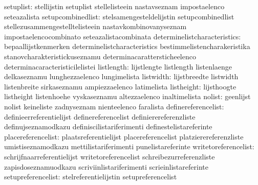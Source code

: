                        setuplist: stellijstin                      setuplist
                                  stellelisteein                   nastavseznam
                                  impostaelenco                    seteazalista
               setupcombinedlist: stelsamengesteldelijstin         setupcombinedlist
                                  stellezusammengestelltelisteein  nastavkombinovanyseznam
                                  impostaelencocombinato           seteazalistacombinata
    determinelistcharacteristics: bepaallijstkenmerken             determinelistcharacteristics
                                  bestimmelistencharakeristika     stanovcharakteristickuseznamu
                                  determinacarattersticheelenco    determinacaracteristicilelistei
                      listlength: lijstlengte                      listlength
                                  listenlaenge                     delkaseznamu
                                  lunghezzaelenco                  lungimelista
                       listwidth: lijstbreedte                     listwidth
                                  listenbreite                     sirkaseznamu
                                  ampiezzaelenco                   latimelista
                      listheight: lijsthoogte                      listheight
                                  listenhoehe                      vyskaseznamu
                                  altezzaelenco                    inaltimelista
                          nolist: geenlijst                        nolist
                                  keineliste                       zadnyseznam
                                  nienteelenco                     faralista
             definereferencelist: definieerreferentielijst         definereferencelist
                                  definierereferenzliste           definujseznamodkazu
                                  definiscilistariferimenti        definestelistareferinte
              placereferencelist: plaatsreferentielijst            placereferencelist
                                  platzierereferenzliste           umistiseznamodkazu
                                  mettilistariferimenti            punelistareferinte
            writetoreferencelist: schrijfnaarreferentielijst       writetoreferencelist
                                  schreibezurreferenzliste         zapisdoseznamuodkazu
                                  scriviinlistariferimenti         scrieinlistareferinte
              setupreferencelist: stelreferentielijstin            setupreferencelist
